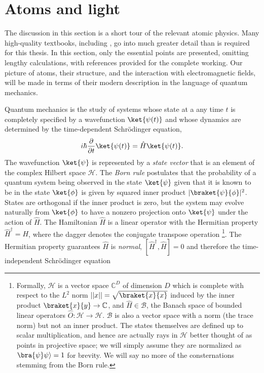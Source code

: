 
\section{Atoms and light}

	The discussion in this section is a short tour of the relevant atomic physics.
	Many high-quality textbooks, including \cite{FootAtomic,BinneyBook}, go into much greater detail than is required for this thesis.
	In this section, only the essential points are presented, omitting lengthy calculations, with references provided for the complete working.
	Our picture of atoms, their structure, and the interaction with electromagnetic fields, will be made in terms of their modern description in the language of quantum mechanics.

	Quantum mechanics is the study of systems whose state at a any time $t$ is completely specified by a wavefunction $\ket{\psi(t)}$ and whose dynamics are determined by the time-dependent Schr\"{o}dinger equation,
	\begin{equation}
		i\hbar\frac{\partial}{\partial t}\ket{\psi(t)} = \hat{H}\ket{\psi(t)}.
		\label{eqn:TDSE}
	\end{equation}
	The wavefunction $\ket{\psi}$ is represented by a \emph{state vector} that is an element of the complex Hilbert space $\mathcal{H}$.
	The \emph{Born rule} postulates that the probability of a quantum system being observed in the state $\ket{\psi}$ given that it is known to be in the state $\ket{\phi}$ is given by squared inner product $|\braket{\psi}{\phi}|^2$.
	States are orthogonal if the inner product is zero, but the system may evolve naturally from $\ket{\phi}$ to have a nonzero projection onto $\ket{\psi}$ under the action of $\hat{H}$.
	The Hamiltonian $\hat{H}$ is a linear operator with the Hermitian property $\hat{H}^\dagger=H$, where the dagger denotes the conjugate transpose operation \footnote{Formally, $\mathcal{H}$ is a vector space $\mathbb{C}^D$ of dimension $D$ which is complete with respect to the $L^2$ norm $||x||=\sqrt{\braket{x}{x}}$ induced by the inner product $\braket{x}{y}\rightarrow\mathbb{C}$, and $\hat{H}\in\mathcal{B}$, the Banach space of bounded linear operators $\hat{O}:\mathcal{H}\rightarrow\mathcal{H}$.
	$\mathcal{B}$ is also a vector space with a norm (the trace norm) but not an inner product.
	The states themselves are defined up to scalar multiplication, and hence are actually rays in $\mathcal{H}$ better thought of as points in projective space; we will simply assume they are normalized as $\bra{\psi}\psi\rangle=1$ for brevity.
	We will say no more of the consternations stemming from the Born rule.}.	
	The Hermitian property guarantees $\hat{H}$ is \emph{normal}, $[\hat{H}^\dagger, \hat{H}]=0$ and therefore the time-independent Schr\"{o}dinger equation

